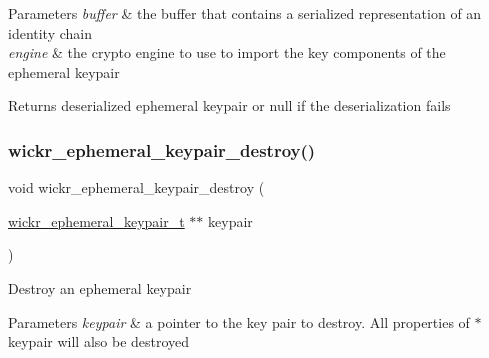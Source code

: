 \begin{DoxyParams}{Parameters}
{\em buffer} & the buffer that contains a serialized representation of an identity chain \\
\hline
{\em engine} & the crypto engine to use to import the key components of the ephemeral keypair \\
\hline
\end{DoxyParams}
\begin{DoxyReturn}{Returns}
deserialized ephemeral keypair or null if the deserialization fails 
\end{DoxyReturn}
\mbox{\label{group__wickr__ephemeral__keypair_gab77107c0b1a0d145c606817eeecec63d}} 
\subsubsection{\texorpdfstring{wickr\+\_\+ephemeral\+\_\+keypair\+\_\+destroy()}{wickr\_ephemeral\_keypair\_destroy()}}
{\footnotesize\ttfamily void wickr\+\_\+ephemeral\+\_\+keypair\+\_\+destroy (\begin{DoxyParamCaption}\item[{\mbox{\hyperlink{structwickr__ephemeral__keypair}{wickr\+\_\+ephemeral\+\_\+keypair\+\_\+t}} $\ast$$\ast$}]{keypair }\end{DoxyParamCaption})}

Destroy an ephemeral keypair


\begin{DoxyParams}{Parameters}
{\em keypair} & a pointer to the key pair to destroy. All properties of \textquotesingle{}$\ast$keypair\textquotesingle{} will also be destroyed \\
\hline
\end{DoxyParams}
\mbox{\label{group__wickr__ephemeral__keypair_ga6c0935c579e3d4bdbfeada7cb60c2a1b}} 
